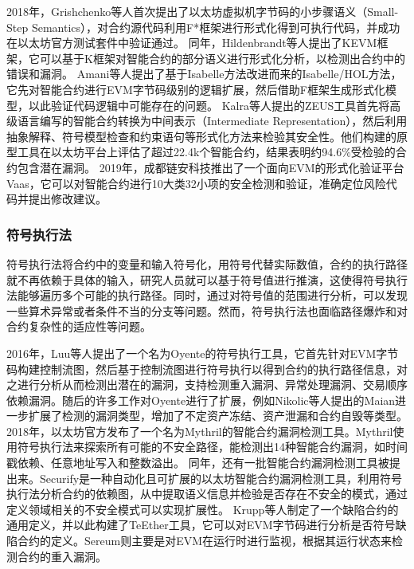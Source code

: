     2018年，Grishchenko等人首次提出了以太坊虚拟机字节码的小步骤语义\cite{grishchenko2018semantic}（Small-Step Semantics），对合约源代码利用F*框架进行形式化得到可执行代码，并成功在以太坊官方测试套件中验证通过。
    同年，Hildenbrandt等人提出了KEVM框架\cite{hildenbrandt2018kevm}，它可以基于K框架对智能合约的部分语义进行形式化分析，以检测出合约中的错误和漏洞。
    Amani等人提出了基于Isabelle方法改进而来的Isabelle/HOL方法\cite{amani2018}，它先对智能合约进行EVM字节码级别的逻辑扩展，然后借助F框架生成形式化模型，以此验证代码逻辑中可能存在的问题。
    Kalra等人提出的ZEUS工具\cite{kalra2018zeus}首先将高级语言编写的智能合约转换为中间表示（Intermediate Representation），然后利用抽象解释、符号模型检查和约束语句等形式化方法来检验其安全性。他们构建的原型工具在以太坊平台上评估了超过22.4k个智能合约，结果表明约94.6\%受检验的合约包含潜在漏洞。
    2019年，成都链安科技推出了一个面向EVM的形式化验证平台Vaas\cite{lianan}，它可以对智能合约进行10大类32小项的安全检测和验证，准确定位风险代码并提出修改建议。

    \subsubsection{符号执行法}
    
    符号执行法将合约中的变量和输入符号化，用符号代替实际数值，合约的执行路径就不再依赖于具体的输入，研究人员就可以基于符号值进行推演，这使得符号执行法能够遍历多个可能的执行路径。同时，通过对符号值的范围进行分析，可以发现一些算术异常或者条件不当的分支等问题。然而，符号执行法也面临路径爆炸和对合约复杂性的适应性等问题。
    
    2016年，Luu等人提出了一个名为Oyente\cite{luu2016making}的符号执行工具，它首先针对EVM字节码构建控制流图，然后基于控制流图进行符号执行以得到合约的执行路径信息，对之进行分析从而检测出潜在的漏洞，支持检测重入漏洞、异常处理漏洞、交易顺序依赖漏洞。随后的许多工作对Oyente进行了扩展，例如Nikolic等人提出的Maian\cite{maian}进一步扩展了检测的漏洞类型，增加了不定资产冻结、资产泄漏和合约自毁等类型。
    2018年，以太坊官方发布了一个名为Mythril\cite{mythril}的智能合约漏洞检测工具。Mythril使用符号执行法来探索所有可能的不安全路径，能检测出14种智能合约漏洞，如时间戳依赖、任意地址写入和整数溢出。
    同年，还有一批智能合约漏洞检测工具被提出来。Securify\cite{tsankov2018securify}是一种自动化且可扩展的以太坊智能合约漏洞检测工具，利用符号执行法分析合约的依赖图，从中提取语义信息并检验是否存在不安全的模式，通过定义领域相关的不安全模式可以实现扩展性。
    Krupp等人制定了一个缺陷合约的通用定义，并以此构建了TeEther\cite{krupp2018teether}工具，它可以对EVM字节码进行分析是否符号缺陷合约的定义。Sereum\cite{rodler2018sereum}则主要是对EVM在运行时进行监视，根据其运行状态来检测合约的重入漏洞。
